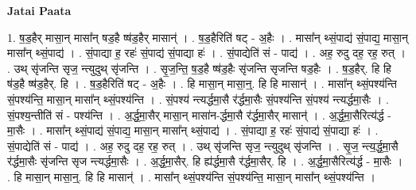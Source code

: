 \documentclass[17pt]{extarticle}
\begin{document}
\textbf{Jatai Paata} \newline

1. ष॒ड॒हैर् मासा॒न् मासा᳚न् षड॒है ष्ष॑ड॒हैर् मासान्॑ । . ष॒ड॒हैरिति॑ षट् - अ॒हैः । . मासा᳚न् थ्सं॒पाद्य॑ सं॒पाद्य॒ मासा॒न् मासा᳚न् थ्सं॒पाद्य॑ । . सं॒पाद्या ह॒ रहः॑ सं॒पाद्य॑ सं॒पाद्या हः॑ । . सं॒पाद्येति॑ सं - पाद्य॑ । . अह॒ रुदु दह॒ रह॒ रुत् । . उथ् सृ॑जन्ति सृज॒ न्त्युदुथ् सृ॑जन्ति । . सृ॒ज॒न्ति॒ ष॒ड॒है ष्ष॑ड॒हैः सृ॑जन्ति सृजन्ति षड॒हैः । . ष॒ड॒हैर्. हि हि ष॑ड॒है ष्ष॑ड॒हैर्. हि । . ष॒ड॒हैरिति॑ षट् - अ॒हैः । . हि मासा॒न् मासा॒न्॒. हि हि मासान्॑ । . मासा᳚न् थ्सं॒पश्य॑न्ति सं॒पश्य॑न्ति॒ मासा॒न् मासा᳚न् थ्सं॒पश्य॑न्ति । . सं॒पश्य॑ न्त्यर्द्धमा॒सै र॑र्द्धमा॒सैः सं॒पश्य॑न्ति सं॒पश्य॑ न्त्यर्द्धमा॒सैः । . सं॒पश्य॒न्तीति॑ सं - पश्य॑न्ति । . अ॒र्द्ध॒मा॒सैर् मासा॒न् मासा॑न-र्द्धमा॒सै र॑र्द्धमा॒सैर् मासान्॑ । . अ॒र्द्ध॒मा॒सैरित्य॑र्द्ध - मा॒सैः । . मासा᳚न् थ्सं॒पाद्य॑ सं॒पाद्य॒ मासा॒न् मासा᳚न् थ्सं॒पाद्य॑ । . सं॒पाद्या ह॒ रहः॑ सं॒पाद्य॑ सं॒पाद्या हः॑ । . सं॒पाद्येति॑ सं - पाद्य॑ । . अह॒ रुदु दह॒ रह॒ रुत् । . उथ् सृ॑जन्ति सृज॒ न्त्युदुथ् सृ॑जन्ति । . सृ॒ज॒ न्त्य॒र्द्ध॒मा॒सै र॑र्द्धमा॒सैः सृ॑जन्ति सृज न्त्यर्द्धमा॒सैः । . अ॒र्द्ध॒मा॒सैर्. हि ह्य॑र्द्धमा॒सै र॑र्द्धमा॒सैर्. हि । . अ॒र्द्ध॒मा॒सैरित्य॑र्द्ध - मा॒सैः । . हि मासा॒न् मासा॒न्॒. हि हि मासान्॑ । . मासा᳚न् थ्सं॒पश्य॑न्ति सं॒पश्य॑न्ति॒ मासा॒न् मासा᳚न् थ्सं॒पश्य॑न्ति । \newline
\end{document}
